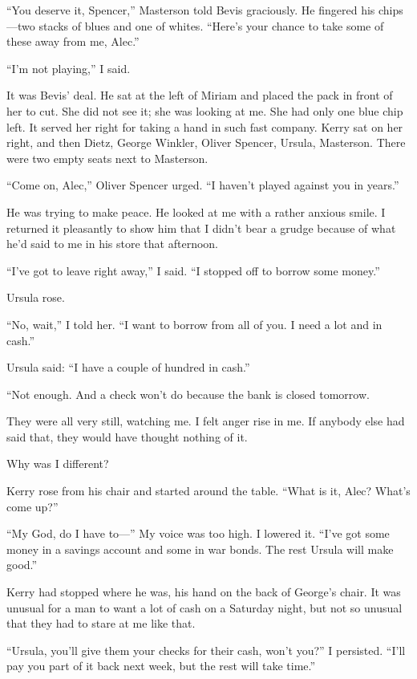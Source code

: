 \documentclass{novel}
\begin{document}
“You deserve it, Spencer,” Masterson told Bevis graciously. He fingered his chips—two stacks of blues and one of whites. “Here’s your chance to take some of these away from me, Alec.”

“I’m not playing,” I said.

It was Bevis’ deal. He sat at the left of Miriam and placed the pack in front of her to cut. She did not see it; she was looking at me. She had only one blue chip left. It served her right for taking a hand in such fast company. Kerry sat on her right, and then Dietz, George Winkler, Oliver Spencer, Ursula, Masterson. There were two empty seats next to Masterson.

“Come on, Alec,” Oliver Spencer urged. “I haven’t played against you in years.”

He was trying to make peace. He looked at me with a rather anxious smile. I returned it pleasantly to show him that I didn’t bear a grudge because of what he’d said to me in his store that afternoon.

“I’ve got to leave right away,” I said. “I stopped off to borrow some money.”

Ursula rose.

“No, wait,” I told her. “I want to borrow from all of you. I need a lot and in cash.”

Ursula said: “I have a couple of hundred in cash.”

“Not enough. And a check won’t do because the bank is closed tomorrow.

\scenestars

They were all very still, watching me. I felt anger rise in me. If anybody else had said that, they would have thought nothing of it. 

Why was I different?

Kerry rose from his chair and started around the table. “What is it, Alec? What’s come up?”

“My God, do I have to—” My voice was too high. I lowered it. “I’ve got some money in a savings account and some in war bonds. The rest Ursula will make good.”

Kerry had stopped where he was, his hand on the back of George’s chair. It was unusual for a man to want a lot of cash on a Saturday night, but not so unusual that they had to stare at me like that.

“Ursula, you’ll give them your checks for their cash, won’t you?” I persisted. “I’ll pay you part of it back next week, but the rest will take time.”
\end{document}
